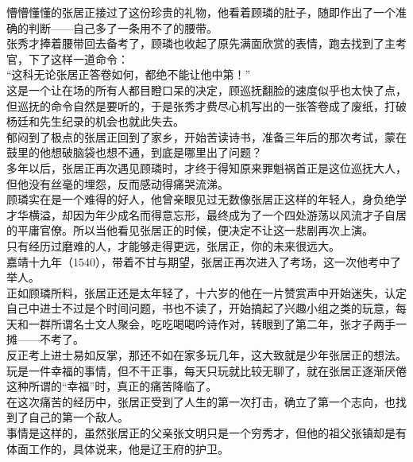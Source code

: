 \begin{multicols}{\theparacolNo}
懵懵懂懂的张居正接过了这份珍贵的礼物，他看着顾璘的肚子，随即作出了一个准确的判断——自己多了一条用不了的腰带。\\

张秀才捧着腰带回去备考了，顾璘也收起了原先满面欣赏的表情，跑去找到了主考官，下了这样一道命令：\\

“这科无论张居正答卷如何，都绝不能让他中第！”\\

这是一个让在场的所有人都目瞪口呆的决定，顾巡抚翻脸的速度似乎也太快了点，但巡抚的命令自然是要听的，于是张秀才费尽心机写出的一张答卷成了废纸，打破杨廷和先生纪录的机会也就此失去。\\

郁闷到了极点的张居正回到了家乡，开始苦读诗书，准备三年后的那次考试，蒙在鼓里的他想破脑袋也想不通，到底是哪里出了问题？\\

多年以后，张居正再次遇见顾璘时，才终于得知原来罪魁祸首正是这位巡抚大人，但他没有丝毫的埋怨，反而感动得痛哭流涕。\\

顾璘实在是一个难得的好人，他曾亲眼见过无数像张居正这样的年轻人，身负绝学才华横溢，却因为年少成名而得意忘形，最终成为了一个四处游荡以风流才子自居的平庸官僚。所以当他看见张居正的时候，便决定不让这一悲剧再次上演。\\

只有经历过磨难的人，才能够走得更远，张居正，你的未来很远大。\\

嘉靖十九年（1540），带着不甘与期望，张居正再次进入了考场，这一次他考中了举人。\\

正如顾璘所料，张居正还是太年轻了，十六岁的他在一片赞赏声中开始迷失，认定自己中进士不过是个时间问题，书也不读了，开始搞起了兴趣小组之类的玩意，每天和一群所谓名士文人聚会，吃吃喝喝吟诗作对，转眼到了第二年，张才子两手一摊——不考了。\\

反正考上进士易如反掌，那还不如在家多玩几年，这大致就是少年张居正的想法。\\

玩是一件幸福的事情，但不干正事，每天只玩就比较无聊了，就在张居正逐渐厌倦这种所谓的“幸福”时，真正的痛苦降临了。\\

在这次痛苦的经历中，张居正受到了人生的第一次打击，确立了第一个志向，也找到了自己的第一个敌人。\\

事情是这样的，虽然张居正的父亲张文明只是一个穷秀才，但他的祖父张镇却是有体面工作的，具体说来，他是辽王府的护卫。\\


\end{multicols}
